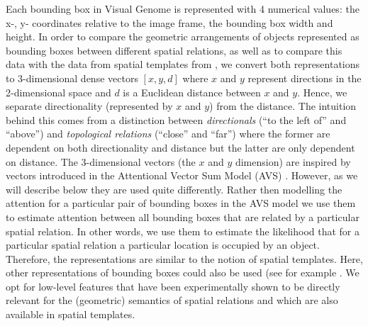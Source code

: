 Each bounding box in Visual Genome is represented with 4 numerical
values: the x-, y- coordinates relative to the image frame, the
bounding box width and
height. %
In order to compare the geometric arrangements of objects represented
as bounding boxes between different spatial relations, as well as to
compare this data with the data from spatial templates from
\cite{logan1996computational}, we convert both representations to
3-dimensional dense vectors $[x,y,d]$ where $x$ and $y$ represent
directions in the 2-dimensional space and $d$ is a Euclidean distance
between $x$ and $y$. Hence, we separate directionality (represented by
$x$ and $y$) from the distance. The intuition behind this comes from a
distinction between \emph{directionals} (``to the left of'' and
``above'') and \emph{topological relations} (``close'' and ``far'')
where the former are dependent on both directionality and distance but
the latter are only dependent on distance. The 3-dimensional vectors
(the $x$ and $y$ dimension) are inspired by vectors introduced in the
Attentional Vector Sum Model (AVS) \cite{RegierCarlson:2001}. However,
as we will describe below they are used quite differently. Rather then
modelling the attention for a particular pair of bounding boxes in the
AVS model we use them to estimate attention between all bounding boxes
that are related by a particular spatial relation. In other words, we
use them to estimate the likelihood that for a particular spatial
relation a particular location is occupied by an object. Therefore,
the representations are similar to the notion of spatial
templates. Here, other representations of bounding boxes could also be
used (see for example \cite{Sadeghi:2015aa,Nikolaus:2019aa}. We opt
for low-level features that have been experimentally shown to be
directly relevant for the (geometric) semantics of spatial relations
and which are also available in spatial templates.



